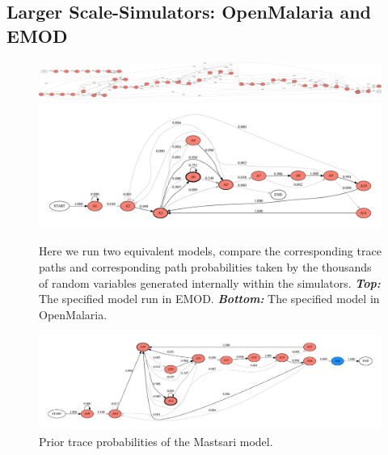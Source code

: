 \documentclass{article}
\begin{document}
\subsection{Larger Scale-Simulators: OpenMalaria and EMOD}

\begin{figure}[h!]
  \centering
  \includegraphics[width=\textwidth]{../plots/final_emod_traces__rotated.pdf}
  \includegraphics[width=\textwidth]{../plots/ewan_25_pop_100.pdf}
  \caption{Here we run two equivalent models, compare the corresponding trace paths and corresponding 
  path probabilities taken by the thousands of random variables generated internally within the simulators. \textit{\textbf{Top:}} The specified model run in EMOD. \textit{\textbf{Bottom:}} The specified model in OpenMalaria.}
  \label{fig:plotewan}
\end{figure}

\begin{figure}
  \centering
  \includegraphics[width=\textwidth]{../plots/mastsari/mastsari_prior_trace_structure.pdf}
  \caption{Prior trace probabilities of the Mastsari model.}
  \label{fig:priortracemastsari}
\end{figure}
\end{document}
